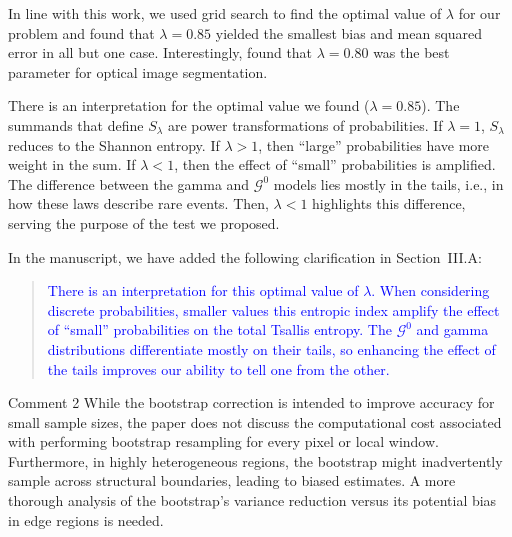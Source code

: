 \documentclass[11pt]{report}
\begin{document}
\begin{responsebox}{}
In line with this work, we used grid search to find the optimal value of $\lambda$ for our problem and found that $\lambda=0.85$ yielded the smallest bias and mean squared error in all but one case.
Interestingly, \citet{TheApplicationofTsallisEntropyBasedSelfAdaptiveAlgorithmforMultiThresholdImageSegmentation} found that $\lambda=0.80$ was the best parameter for optical image segmentation.

There is an interpretation for the optimal value we found ($\lambda=0.85$).
The summands that define $S_\lambda$ are power transformations of probabilities.
If $\lambda=1$, $S_\lambda$ reduces to the Shannon entropy.
If $\lambda>1$, then ``large'' probabilities have more weight in the sum.
If $\lambda<1$, then the effect of ``small'' probabilities is amplified.
The difference between the gamma and $\mathcal G^0$ models lies mostly in the tails, i.e., in how these laws describe rare events.
Then, $\lambda<1$ highlights this difference, serving the purpose of the test we proposed.

In the manuscript, we have added the following clarification in Section~III.A:
\begin{quote}
\textcolor{blue}{There is an interpretation for this optimal value of $\lambda$.
When considering discrete probabilities, smaller values this entropic index
amplify the effect of ``small'' probabilities on the total Tsallis entropy.
The $\mathcal G^0$ and gamma distributions differentiate mostly on their tails,
so enhancing the effect of the tails improves our ability to tell one from the other.}
\end{quote}
\end{responsebox}

\vspace{1em}

\begin{reviewbox}{Comment 2}
While the bootstrap correction is intended to improve accuracy for small sample sizes, the paper does not discuss the computational cost associated with performing bootstrap resampling for every pixel or local window. Furthermore, in highly heterogeneous regions, the bootstrap might inadvertently sample across structural boundaries, leading to biased estimates. A more thorough analysis of the bootstrap’s variance reduction versus its potential bias in edge regions is needed.
\end{reviewbox}
\end{document}
